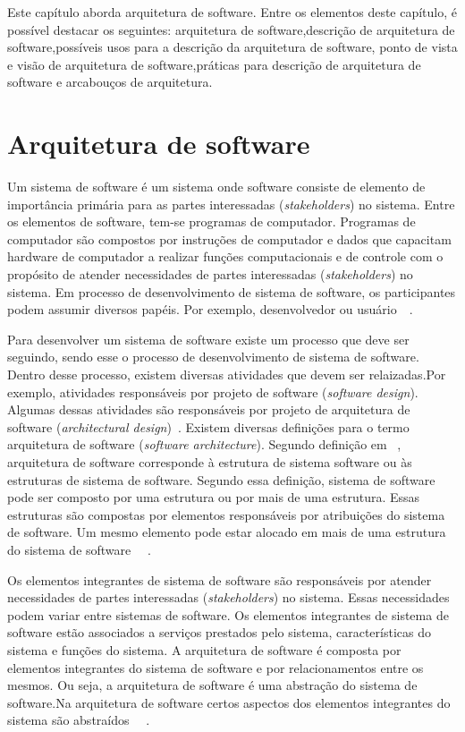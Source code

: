Este capítulo aborda arquitetura de software. Entre os elementos deste capítulo, é possível destacar os seguintes: arquitetura de software,descrição de arquitetura de software,possíveis usos para a descrição da arquitetura de software, ponto de vista e visão de arquitetura de software,práticas para descrição de arquitetura de software e arcabouços de arquitetura.

\section{Arquitetura de software}

Um sistema de software é um sistema onde software consiste de elemento de importância primária para as partes interessadas (\emph{stakeholders}) no sistema. Entre os elementos de software, tem-se programas de computador. Programas de computador são compostos por instruções de computador e dados que capacitam hardware de computador a realizar funções computacionais e de controle com o propósito de atender necessidades de partes interessadas (\emph{stakeholders}) no sistema. Em processo de desenvolvimento de sistema de software, os participantes podem assumir diversos papéis. Por exemplo, desenvolvedor ou usuário~\cite{Sevocab}~\cite{ISO_24765}.

Para desenvolver um sistema de software existe um processo que deve ser seguindo, sendo esse o processo de desenvolvimento de sistema de software. Dentro desse processo, existem diversas atividades que devem ser relaizadas.Por exemplo, atividades responsáveis por projeto de software (\emph{software design}). Algumas dessas atividades  são responsáveis por projeto de arquitetura de software (\emph{architectural design})~\cite{Sommerville_2011_texbook}. Existem diversas definições para o termo arquitetura de software (\emph{software architecture}). Segundo definição em ~\cite{arq_01}, arquitetura de software corresponde à estrutura de sistema software ou às estruturas de sistema de software. Segundo essa definição, sistema de software pode ser composto por uma estrutura ou por mais de uma estrutura. Essas estruturas são compostas por elementos responsáveis por atribuições do sistema de software. Um mesmo elemento pode estar alocado em mais de uma estrutura do sistema de software ~\cite{arq_01}~\cite{Carnegie_textbook}.

Os elementos integrantes de sistema de software são responsáveis por atender necessidades de partes interessadas (\emph{stakeholders}) no sistema. Essas necessidades podem variar entre sistemas de software. Os elementos integrantes de sistema de software estão associados a serviços prestados pelo sistema, características do sistema e funções do sistema. A arquitetura de software é composta por elementos integrantes do sistema de software e por relacionamentos entre os mesmos. Ou seja, a arquitetura de software é uma abstração do sistema de software.Na arquitetura de software certos aspectos dos elementos integrantes do sistema são abstraídos ~\cite{arq_01}~\cite{Carnegie_textbook}.

